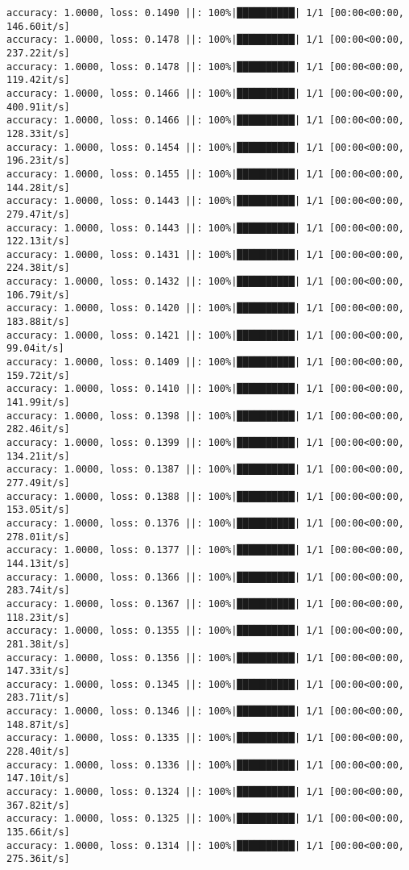\documentclass[
]{article}
\begin{document}
\begin{verbatim}
accuracy: 1.0000, loss: 0.1490 ||: 100%|██████████| 1/1 [00:00<00:00, 146.60it/s]
accuracy: 1.0000, loss: 0.1478 ||: 100%|██████████| 1/1 [00:00<00:00, 237.22it/s]
accuracy: 1.0000, loss: 0.1478 ||: 100%|██████████| 1/1 [00:00<00:00, 119.42it/s]
accuracy: 1.0000, loss: 0.1466 ||: 100%|██████████| 1/1 [00:00<00:00, 400.91it/s]
accuracy: 1.0000, loss: 0.1466 ||: 100%|██████████| 1/1 [00:00<00:00, 128.33it/s]
accuracy: 1.0000, loss: 0.1454 ||: 100%|██████████| 1/1 [00:00<00:00, 196.23it/s]
accuracy: 1.0000, loss: 0.1455 ||: 100%|██████████| 1/1 [00:00<00:00, 144.28it/s]
accuracy: 1.0000, loss: 0.1443 ||: 100%|██████████| 1/1 [00:00<00:00, 279.47it/s]
accuracy: 1.0000, loss: 0.1443 ||: 100%|██████████| 1/1 [00:00<00:00, 122.13it/s]
accuracy: 1.0000, loss: 0.1431 ||: 100%|██████████| 1/1 [00:00<00:00, 224.38it/s]
accuracy: 1.0000, loss: 0.1432 ||: 100%|██████████| 1/1 [00:00<00:00, 106.79it/s]
accuracy: 1.0000, loss: 0.1420 ||: 100%|██████████| 1/1 [00:00<00:00, 183.88it/s]
accuracy: 1.0000, loss: 0.1421 ||: 100%|██████████| 1/1 [00:00<00:00, 99.04it/s]
accuracy: 1.0000, loss: 0.1409 ||: 100%|██████████| 1/1 [00:00<00:00, 159.72it/s]
accuracy: 1.0000, loss: 0.1410 ||: 100%|██████████| 1/1 [00:00<00:00, 141.99it/s]
accuracy: 1.0000, loss: 0.1398 ||: 100%|██████████| 1/1 [00:00<00:00, 282.46it/s]
accuracy: 1.0000, loss: 0.1399 ||: 100%|██████████| 1/1 [00:00<00:00, 134.21it/s]
accuracy: 1.0000, loss: 0.1387 ||: 100%|██████████| 1/1 [00:00<00:00, 277.49it/s]
accuracy: 1.0000, loss: 0.1388 ||: 100%|██████████| 1/1 [00:00<00:00, 153.05it/s]
accuracy: 1.0000, loss: 0.1376 ||: 100%|██████████| 1/1 [00:00<00:00, 278.01it/s]
accuracy: 1.0000, loss: 0.1377 ||: 100%|██████████| 1/1 [00:00<00:00, 144.13it/s]
accuracy: 1.0000, loss: 0.1366 ||: 100%|██████████| 1/1 [00:00<00:00, 283.74it/s]
accuracy: 1.0000, loss: 0.1367 ||: 100%|██████████| 1/1 [00:00<00:00, 118.23it/s]
accuracy: 1.0000, loss: 0.1355 ||: 100%|██████████| 1/1 [00:00<00:00, 281.38it/s]
accuracy: 1.0000, loss: 0.1356 ||: 100%|██████████| 1/1 [00:00<00:00, 147.33it/s]
accuracy: 1.0000, loss: 0.1345 ||: 100%|██████████| 1/1 [00:00<00:00, 283.71it/s]
accuracy: 1.0000, loss: 0.1346 ||: 100%|██████████| 1/1 [00:00<00:00, 148.87it/s]
accuracy: 1.0000, loss: 0.1335 ||: 100%|██████████| 1/1 [00:00<00:00, 228.40it/s]
accuracy: 1.0000, loss: 0.1336 ||: 100%|██████████| 1/1 [00:00<00:00, 147.10it/s]
accuracy: 1.0000, loss: 0.1324 ||: 100%|██████████| 1/1 [00:00<00:00, 367.82it/s]
accuracy: 1.0000, loss: 0.1325 ||: 100%|██████████| 1/1 [00:00<00:00, 135.66it/s]
accuracy: 1.0000, loss: 0.1314 ||: 100%|██████████| 1/1 [00:00<00:00, 275.36it/s]

\end{verbatim}
\end{document}
